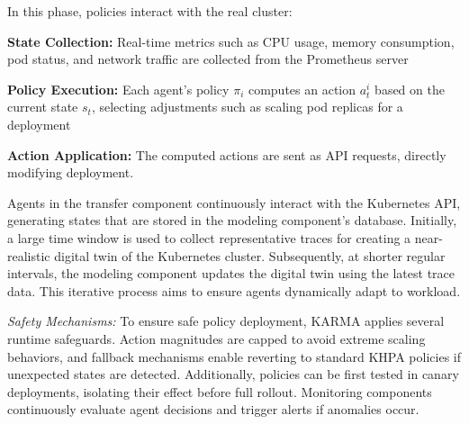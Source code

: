 \documentclass[conference]{IEEEtran}
\begin{document}
In this phase, policies interact with the real cluster:
\begin{enumerate*}[label=\textbf{\arabic*)}, itemjoin={;\quad }]
    \item \textbf{State Collection:} Real-time metrics such as CPU usage, memory consumption, pod status, and network traffic are collected from the Prometheus server~\cite{prometheus}
    \item \textbf{Policy Execution:} Each agent's policy $\pi_i$ computes an action $a_t^i$ based on the current state $s_t$, selecting adjustments such as scaling pod replicas for a deployment
    \item \textbf{Action Application:} The computed actions are sent as API requests, directly modifying deployment.
\end{enumerate*}

Agents in the transfer component continuously interact with the Kubernetes API, generating states that are stored in the modeling component's database. Initially, a large time window is used to collect representative traces for creating a near-realistic digital twin of the Kubernetes cluster. Subsequently, at shorter regular intervals, the modeling component updates the digital twin using the latest trace data. This iterative process aims to ensure agents dynamically adapt to workload.

\noindent \textit{Safety Mechanisms:} To ensure safe policy deployment, KARMA applies several runtime safeguards. Action magnitudes are capped to avoid extreme scaling behaviors, and fallback mechanisms enable reverting to standard KHPA policies if unexpected states are detected. Additionally, policies can be first tested in canary deployments, isolating their effect before full rollout. Monitoring components continuously evaluate agent decisions and trigger alerts if anomalies occur.

%


\end{document}
